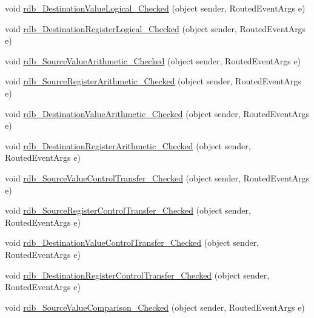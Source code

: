 \begin{DoxyCompactItemize}
\item 
void \hyperlink{class_c_p_u___o_s___simulator_1_1_instructions_window_ae4f933abbff92c008d38f9b3e9008315}{rdb\+\_\+\+Destination\+Value\+Logical\+\_\+\+Checked} (object sender, Routed\+Event\+Args e)
\item 
void \hyperlink{class_c_p_u___o_s___simulator_1_1_instructions_window_af0d373665806dc4e8798761c967ead81}{rdb\+\_\+\+Destination\+Register\+Logical\+\_\+\+Checked} (object sender, Routed\+Event\+Args e)
\item 
void \hyperlink{class_c_p_u___o_s___simulator_1_1_instructions_window_a8a693624b1b25769de9cccfaea819daf}{rdb\+\_\+\+Source\+Value\+Arithmetic\+\_\+\+Checked} (object sender, Routed\+Event\+Args e)
\item 
void \hyperlink{class_c_p_u___o_s___simulator_1_1_instructions_window_aed7531afdb080427f98bc26b5488fd18}{rdb\+\_\+\+Source\+Register\+Arithmetic\+\_\+\+Checked} (object sender, Routed\+Event\+Args e)
\item 
void \hyperlink{class_c_p_u___o_s___simulator_1_1_instructions_window_a41782c6995180cad160c5e8f46ce5739}{rdb\+\_\+\+Destination\+Value\+Arithmetic\+\_\+\+Checked} (object sender, Routed\+Event\+Args e)
\item 
void \hyperlink{class_c_p_u___o_s___simulator_1_1_instructions_window_a4625e511a95aa3cce6550f2b0fd60aea}{rdb\+\_\+\+Destination\+Register\+Arithmetic\+\_\+\+Checked} (object sender, Routed\+Event\+Args e)
\item 
void \hyperlink{class_c_p_u___o_s___simulator_1_1_instructions_window_a05f9924f69791130e674933886386965}{rdb\+\_\+\+Source\+Value\+Control\+Transfer\+\_\+\+Checked} (object sender, Routed\+Event\+Args e)
\item 
void \hyperlink{class_c_p_u___o_s___simulator_1_1_instructions_window_a6f9bce58d8e409879131619b7316b990}{rdb\+\_\+\+Source\+Register\+Control\+Transfer\+\_\+\+Checked} (object sender, Routed\+Event\+Args e)
\item 
void \hyperlink{class_c_p_u___o_s___simulator_1_1_instructions_window_a308ca537f9fb659b301b92c426840088}{rdb\+\_\+\+Destination\+Value\+Control\+Transfer\+\_\+\+Checked} (object sender, Routed\+Event\+Args e)
\item 
void \hyperlink{class_c_p_u___o_s___simulator_1_1_instructions_window_a0abcc3b1c9dbbc04379f35bfc645b58b}{rdb\+\_\+\+Destination\+Register\+Control\+Transfer\+\_\+\+Checked} (object sender, Routed\+Event\+Args e)
\item 
void \hyperlink{class_c_p_u___o_s___simulator_1_1_instructions_window_aa5413c4f240c448298867dfca5474d52}{rdb\+\_\+\+Source\+Value\+Comparison\+\_\+\+Checked} (object sender, Routed\+Event\+Args e)

\end{DoxyCompactItemize}
